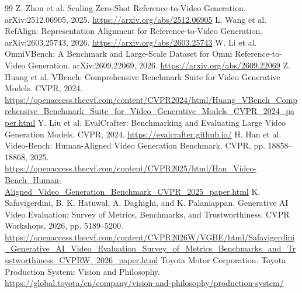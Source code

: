 \documentclass[11pt,a4paper]{article}
\begin{document}
\begin{thebibliography}{99}
Z. Zhou et al. \newblock Scaling Zero-Shot Reference-to-Video Generation. \newblock arXiv:2512.06905, 2025. \url{https://arxiv.org/abs/2512.06905}
L. Wang et al. \newblock RefAlign: Representation Alignment for Reference-to-Video Generation. \newblock arXiv:2603.25743, 2026. \url{https://arxiv.org/abs/2603.25743}
W. Li et al. \newblock OmniVBench: A Benchmark and Large-Scale Dataset for Omni Reference-to-Video Generation. \newblock arXiv:2609.22069, 2026. \url{https://arxiv.org/abs/2609.22069}
Z. Huang et al. \newblock VBench: Comprehensive Benchmark Suite for Video Generative Models. \newblock CVPR, 2024. \url{https://openaccess.thecvf.com/content/CVPR2024/html/Huang_VBench_Comprehensive_Benchmark_Suite_for_Video_Generative_Models_CVPR_2024_paper.html}
Y. Liu et al. \newblock EvalCrafter: Benchmarking and Evaluating Large Video Generation Models. \newblock CVPR, 2024. \url{https://evalcrafter.github.io/}
H. Han et al. \newblock Video-Bench: Human-Aligned Video Generation Benchmark. \newblock CVPR, pp. 18858--18868, 2025. \url{https://openaccess.thecvf.com/content/CVPR2025/html/Han_Video-Bench_Human-Aligned_Video_Generation_Benchmark_CVPR_2025_paper.html}
K. Safavigerdini, B. K. Hatuwal, A. Daghighi, and K. Palaniappan. \newblock Generative AI Video Evaluation: Survey of Metrics, Benchmarks, and Trustworthiness. \newblock CVPR Workshops, 2026, pp. 5189--5200. \url{https://openaccess.thecvf.com/content/CVPR2026W/VGBE/html/Safavigerdini_Generative_AI_Video_Evaluation_Survey_of_Metrics_Benchmarks_and_Trustworthiness_CVPRW_2026_paper.html}
Toyota Motor Corporation. \newblock Toyota Production System: Vision and Philosophy. \url{https://global.toyota/en/company/vision-and-philosophy/production-system/}
\end{thebibliography}
\end{document}
